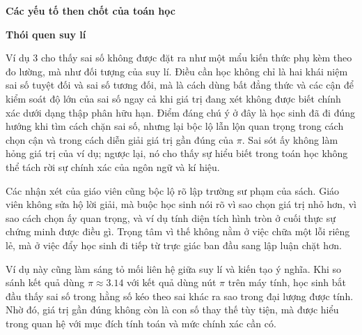 {    \textbf{Các yếu tố then chốt của toán học}

    \begin{hanglist}
      \vspace{\baselineskip}
    \end{hanglist}

    \textbf{Thói quen suy lí}

    \begin{hanglist}


    \end{hanglist}
  }
  {
    \vspace{.5\baselineskip}
    Ví dụ 3 cho thấy sai số không được đặt ra như một mẩu kiến thức phụ kèm theo đo lường, mà như đối tượng của suy lí. Điều cần học không chỉ là hai khái niệm sai số tuyệt đối và sai số tương đối, mà là cách dùng bất đẳng thức và các cận để kiểm soát độ lớn của sai số ngay cả khi giá trị đang xét không được biết chính xác dưới dạng thập phân hữu hạn. Điểm đáng chú ý ở đây là học sinh đã đi đúng hướng khi tìm cách chặn sai số, nhưng lại bộc lộ lẫn lộn quan trọng trong cách chọn cận và trong cách diễn giải giá trị gần đúng của $\pi$. Sai sót ấy không làm hỏng giá trị của ví dụ; ngược lại, nó cho thấy sự hiểu biết trong toán học không thể tách rời sự chính xác của ngôn ngữ và kí hiệu.

    Các nhận xét của giáo viên cũng bộc lộ rõ lập trường sư phạm của sách. Giáo viên không sửa hộ lời giải, mà buộc học sinh nói rõ vì sao chọn giá trị nhỏ hơn, vì sao cách chọn ấy quan trọng, và ví dụ tính diện tích hình tròn ở cuối thực sự chứng minh được điều gì. Trọng tâm vì thế không nằm ở việc chữa một lỗi riêng lẻ, mà ở việc đẩy học sinh đi tiếp từ trực giác ban đầu sang lập luận chặt hơn.

    Ví dụ này cũng làm sáng tỏ mối liên hệ giữa suy lí và kiến tạo ý nghĩa. Khi so sánh kết quả dùng $\pi \approx 3.14$ với kết quả dùng nút $\pi$ trên máy tính, học sinh bắt đầu thấy sai số trong hằng số kéo theo sai khác ra sao trong đại lượng được tính. Nhờ đó, giá trị gần đúng không còn là con số thay thế tùy tiện, mà được hiểu trong quan hệ với mục đích tính toán và mức chính xác cần có.

    \begin{hanglist}
    \end{hanglist}
  }

